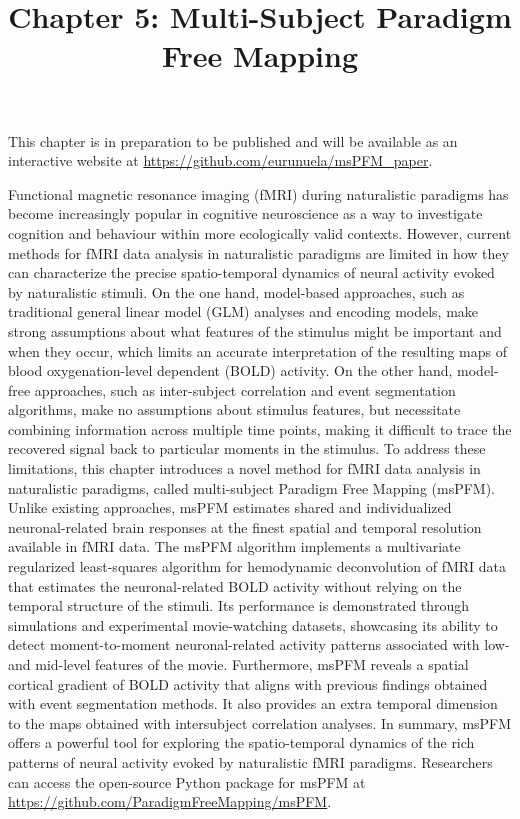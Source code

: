 \title{Chapter 5: Multi-Subject Paradigm Free Mapping}
\label{cha:multi-subject}

This chapter is in preparation to be published and will be available as an
interactive website at \url{https://github.com/eurunuela/msPFM\_paper}.

Functional magnetic resonance imaging (fMRI) during naturalistic paradigms has
become increasingly popular in cognitive neuroscience as a way to investigate
cognition and behaviour within more ecologically valid contexts. However,
current methods for fMRI data analysis in naturalistic paradigms are limited in
how they can characterize the precise spatio-temporal dynamics of neural
activity evoked by naturalistic stimuli. On the one hand, model-based
approaches, such as traditional general linear model (GLM) analyses and encoding
models, make strong assumptions about what features of the stimulus might be
important and when they occur, which limits an accurate interpretation of the
resulting maps of blood oxygenation-level dependent (BOLD) activity. On the
other hand, model-free approaches, such as inter-subject correlation and event
segmentation algorithms, make no assumptions about stimulus features, but
necessitate combining information across multiple time points, making it
difficult to trace the recovered signal back to particular moments in the
stimulus. To address these limitations, this chapter introduces a novel method
for fMRI data analysis in naturalistic paradigms, called multi-subject
Paradigm Free Mapping (msPFM). Unlike existing approaches, msPFM estimates shared and
individualized neuronal-related brain responses at the finest spatial and
temporal resolution available in fMRI data. The msPFM algorithm implements a
multivariate regularized least-squares algorithm for hemodynamic deconvolution
of fMRI data that estimates the neuronal-related BOLD activity without relying
on the temporal structure of the stimuli. Its performance is demonstrated
through simulations and experimental movie-watching datasets, showcasing its
ability to detect moment-to-moment neuronal-related activity patterns associated
with low- and mid-level features of the movie. Furthermore, msPFM reveals a
spatial cortical gradient of BOLD activity that aligns with previous findings
obtained with event segmentation methods. It also provides an extra temporal
dimension to the maps obtained with intersubject correlation analyses.  
In summary, msPFM offers a powerful tool for exploring the spatio-temporal 
dynamics of the rich patterns of neural activity evoked by naturalistic fMRI paradigms. 
Researchers can access the open-source Python package for msPFM at
\url{https://github.com/ParadigmFreeMapping/msPFM}.

